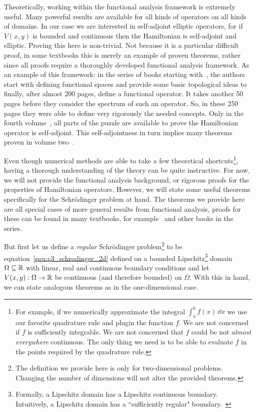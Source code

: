Theoretically, working within the functional analysis framework is extremely useful. Many powerful results are available for all kinds of operators on all kinds of domains. In our case we are interested in self-adjoint elliptic operators, for if $V(x, y)$ is bounded and continuous then the Hamiltonian is self-adjoint and elliptic. Proving this here is non-trivial. Not because it is a particular difficult proof, in some textbooks this is merely an example of proven theorems, rather since all proofs require a thoroughly developed functional analysis framework. As an example of this framework: in the series of books starting with~\cite{reed_functional_1980}, the authors start with defining functional spaces and provide some basic topological ideas to finally, after almost 200 pages, define a functional operator. It takes another 50 pages before they consider the spectrum of such an operator. So, in these 250 pages they were able to define very rigorously the needed concepts. Only in the fourth volume~\cite{reed_iv_1978}, all parts of the puzzle are available to prove the Hamiltonian operator is self-adjoint. This self-adjointness in turn implies many theorems proven in volume two~\cite{reed_ii_1975}.

Even though numerical methods are able to take a few theoretical shortcuts\footnote{For example, if we numerically approximate the integral $\int_a^b f(x)\,\dd x$ we use our favorite quadrature rule and plugin the function $f$. We are not concerned if $f$ is sufficiently integrable. We are not concerned that $f$ could be not \emph{almost everywhere} continuous. The only thing we need is to be able to evaluate $f$ in the points required by the quadrature rule.}, having a thorough understanding of the theory can be quite instructive. For now, we will not provide the functional analysis background, or rigorous proofs for the properties of Hamiltonian operators. However, we will state some useful theorems specifically for the Schrödinger problem at hand. The theorems we provide here are all special cases of more general results from functional analysis, proofs for these can be found in many textbooks, for example~\cite{reed_functional_1980} and other books in the series.

But first let us define a \emph{regular} Schrödinger problem\footnote{The definition we provide here is only for two-dimensional problems. Changing the number of dimensions will not alter the provided theorems.} to be equation~\eqref{equ:c3_schrodinger_2d} defined on a bounded Lipschitz\footnote{Formally, a Lipschitz domain has a Lipschitz continuous boundary. Intuitively, a Lipschitz domain has a ``sufficiently regular" boundary.~\cite{dacorogna_introduction_2008}} domain $\Omega \subseteq \mathbb{R}$ with linear, real and continuous boundary conditions and let $V(x, y) : \Omega \to \mathbb{R}$ be continuous (and therefore bounded) on $\Omega$. With this in hand, we can state analogous theorems as in the one-dimensional case.

